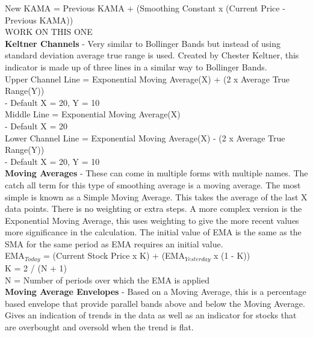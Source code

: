\documentclass[12pt,a4paper]{article}
\begin{document}
New KAMA = Previous KAMA + (Smoothing Constant x (Current Price - Previous KAMA))\\

WORK ON THIS ONE \\

\iffalse
[]
\fi

\textbf{Keltner Channels} - Very similar to Bollinger Bands but instead of using standard deviation average true range is used. Created by Chester Keltner, this indicator is made up of three lines in a similar way to Bollinger Bands.\\

Upper Channel Line = Exponential Moving Average(X) + (2 x Average True Range(Y))\\ - Default X = 20, Y = 10 \\
Middle Line = Exponential Moving Average(X)\\ - Default X = 20 \\
Lower Channel Line = Exponential Moving Average(X) - (2 x Average True Range(Y))\\ - Default X = 20, Y = 10 \\

\iffalse
[]
\fi

\textbf{Moving Averages} - These can come in multiple forms with multiple names. The catch all term for this type of smoothing average is a moving average. The most simple is known as a Simple Moving Average. This takes the average of the last X data points. There is no weighting or extra steps. A more complex version is the Exponential Moving Average, this uses weighting to give the more recent values more significance in the calculation. The initial value of EMA is the same as the SMA for the same period as EMA requires an initial value.\\

EMA$_{Today}$ = (Current Stock Price x K) + (EMA$_{Yesterday}$ x (1 - K)) \\
K = 2 / (N + 1) \\
N = Number of periods over which the EMA is applied \\

\iffalse
[]
\fi

\textbf{Moving Average Envelopes} - Based on a Moving Average, this is a percentage based envelope that provide parallel bands above and below the Moving Average. Gives an indication of trends in the data as well as an indicator for stocks that are overbought and oversold when the trend is flat.\\
\end{document}
